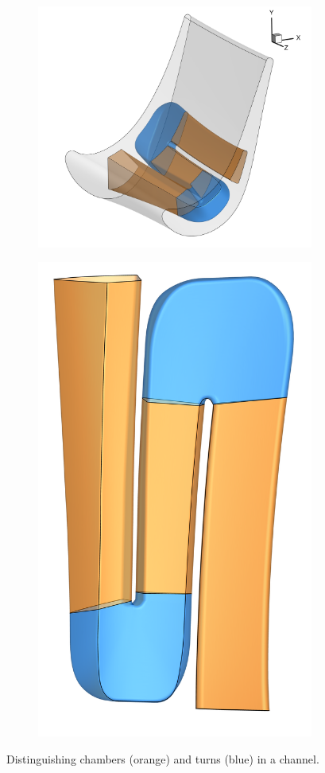 \documentclass[a4paper, 11pt]{report}
\theoremstyle{definition}
\begin{document}
	\begin{figure}[H]
		\centering
		\begin{subfigure}{.49\textwidth}
			\includegraphics[width=\textwidth]{../tec/complete/020.png}
		\end{subfigure}
		\begin{subfigure}{.49\textwidth}
			\centering
			\includegraphics[width=.5\textwidth]{../tec/complete/021.png}
		\end{subfigure}
		\caption{Distinguishing chambers (orange) and turns (blue) in a channel.}
		\label{fig:chambers_vs_turns}
	\end{figure}
\end{document}
